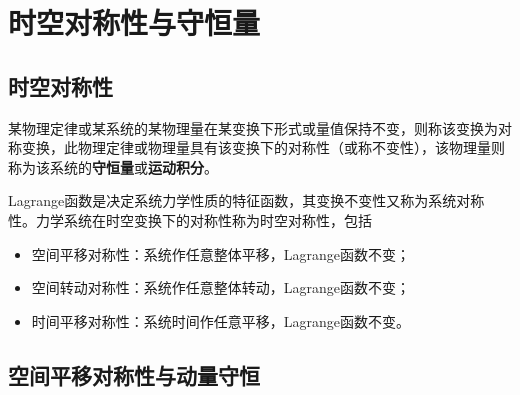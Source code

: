 \section{时空对称性与守恒量}\label{chapter2:section-时空对称性与守恒量}

\subsection{时空对称性}

某物理定律或某系统的某物理量在某变换下形式或量值保持不变，则称该变换为{\heiti 对称变换}，此物理定律或物理量具有该变换下的{\heiti 对称性}（或称{\heiti 不变性}），该物理量则称为该系统的{\bf 守恒量}或{\bf 运动积分}。

Lagrange函数是决定系统力学性质的特征函数，其变换不变性又称为系统对称性。力学系统在时空变换下的对称性称为{\heiti 时空对称性}，包括
\begin{itemize}
	\item {\heiti 空间平移对称性}：系统作任意整体平移，Lagrange函数不变；
	\item {\heiti 空间转动对称性}：系统作任意整体转动，Lagrange函数不变；
	\item {\heiti 时间平移对称性}：系统时间作任意平移，Lagrange函数不变。
\end{itemize}


\subsection{空间平移对称性与动量守恒}

